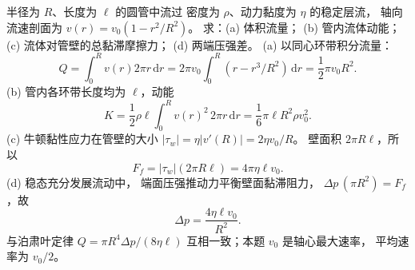 半径为 $R$、长度为 $\ell$ 的圆管中流过
密度为 $\rho$、动力黏度为 $\eta$ 的稳定层流，
轴向流速剖面为
$v(r)=v_0(1-r^2/R^2)$。
求：(a) 体积流量；
(b) 管内流体动能；
(c) 流体对管壁的总黏滞摩擦力；
(d) 两端压强差。
\exsolution
(a) 以同心环带积分流量：
\[
Q=\int_0^R v(r)2\pi r\,\mathrm dr
=2\pi v_0\int_0^R(r-r^3/R^2)\,\mathrm dr
=\boxed{\frac12\pi v_0R^2}.
\]
(b) 管内各环带长度均为 $\ell$，动能
\[
K=\frac12\rho\ell\int_0^R v(r)^2\,2\pi r\,\mathrm dr
=\boxed{\frac16\pi\ell R^2\rho v_0^2}.
\]
(c) 牛顿黏性应力在管壁的大小
$|\tau_w|=\eta|v'(R)|=2\eta v_0/R$。
壁面积 $2\pi R\ell$，所以
\[
\boxed{F_f=|\tau_w|(2\pi R\ell)=4\pi\eta\ell v_0}.
\]
(d) 稳态充分发展流动中，
端面压强推动力平衡壁面黏滞阻力，
$\Delta p\,(\pi R^2)=F_f$，故
\[
\boxed{\Delta p=\frac{4\eta\ell v_0}{R^2}}.
\]
\excheck 与泊肃叶定律
$Q=\pi R^4\Delta p/(8\eta\ell)$
互相一致；本题 $v_0$ 是轴心最大速率，
平均速率为 $v_0/2$。
